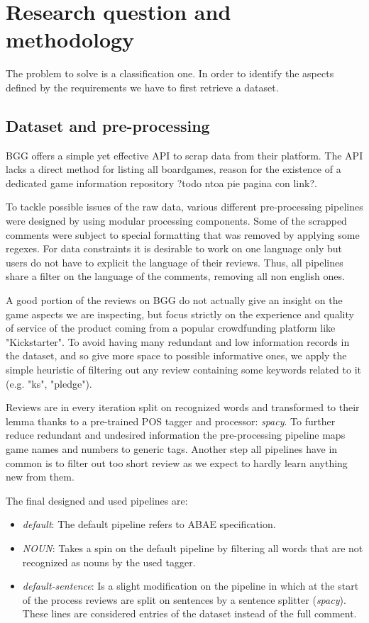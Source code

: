 \section{Research question and methodology}
The problem to solve is a classification one.
In order to identify the aspects defined by the requirements we have to first retrieve a dataset.

\subsection{Dataset and pre-processing}
BGG offers a simple yet effective API to scrap data from their platform.
The API lacks a direct method for listing all boardgames, reason for the existence of a dedicated game information
repository ?todo ntoa pie pagina con link?.

To tackle possible issues of the raw data, various different pre-processing pipelines were designed
by using modular processing components.
Some of the scrapped comments were subject to special formatting that was removed by applying some regexes.
For data constraints it is desirable to work on one language only but users do not have to explicit the language of their reviews.
Thus, all pipelines share a filter on the language of the comments, removing all non english ones.

A good portion of the reviews on BGG do not actually give an insight on the game aspects we are inspecting,
but focus strictly on the experience and quality of service of the product coming from a popular crowdfunding platform like "Kickstarter".
To avoid having many redundant and low information records in the dataset, and so give more space to possible informative ones,
we apply the simple heuristic of filtering out any review containing some keywords related to it (e.g. "ks", "pledge").

Reviews are in every iteration split on recognized words and transformed to their lemma thanks to a pre-trained
POS tagger and processor: \textit{spacy}.
To further reduce redundant and undesired information the pre-processing pipeline maps game names and numbers to generic tags.
Another step all pipelines have in common is to filter out too short review as we expect to hardly learn anything new from them.

The final designed and used pipelines are:
\begin{itemize}
    \item {\textit{default}}: The default pipeline refers to ABAE specification.

    \item {\textit{NOUN}}: Takes a spin on the default pipeline by filtering all words that are not recognized as nouns
    by the used tagger. %

    \item {\textit{default-sentence}}: Is a slight modification on the  pipeline in which
    at the start of the process reviews are split on sentences by a sentence splitter (\textit{spacy}).
    These lines are considered entries of the dataset instead of the full comment.
\end{itemize}


